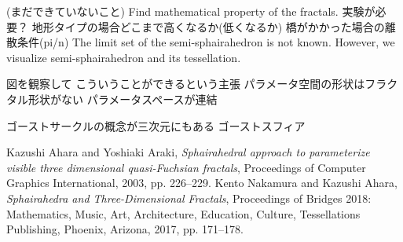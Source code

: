 \documentclass[dvipdfmx]{interact}
\theoremstyle{plain}%
\theoremstyle{definition}
\theoremstyle{remark}
\theoremstyle{problemstyle}
\begin{document}
(まだできていないこと)
Find mathematical property of the fractals.
実験が必要？
地形タイプの場合どこまで高くなるか(低くなるか)
橋がかかった場合の離散条件(pi/n)
The limit set of the semi-sphairahedron is not known.
However, we visualize semi-sphairahedron and its tessellation.

図を観察して こういうことができるという主張
パラメータ空間の形状はフラクタル形状がない
パラメータスペースが連結

ゴーストサークルの概念が三次元にもある
ゴーストスフィア


\begin{thebibliography}{99}
        Kazushi Ahara and Yoshiaki Araki,
        \emph{Sphairahedral approach to parameterize visible three
        dimensional quasi-Fuchsian fractals},
        Proceedings of Computer Graphics International, 2003, pp. 226--229.
        Kento Nakamura and Kazushi Ahara,
        \emph{Sphairahedra and Three-Dimensional Fractals}, 
        Proceedings of Bridges 2018: Mathematics, Music, Art, Architecture,
        Education, Culture, Tessellations Publishing,
        Phoenix, Arizona, 2017, pp. 171--178.
\end{thebibliography}
\end{document}
